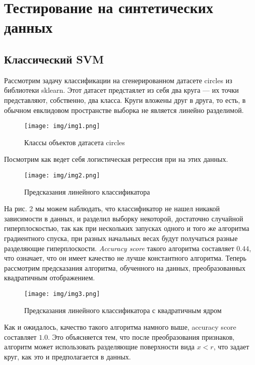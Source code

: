 \documentclass[twoside,twocolumn]{article}
\theoremstyle{plain}
\theoremstyle{definition}
\begin{document}
\section{Тестирование на синтетических данных}
\subsection{Классический SVM}
Рассмотрим задачу классификации на сгенерированном датасете circles из библиотеки sklearn. Этот датасет предстаялет из себя два круга — их
точки представляют, собственно, два класса. Круги вложены друг в друга, то есть, в обычном евклидовом пространстве выборка не является линейно
разделимой.
\begin{figure}[!h]
  \caption{Классы объектов датасета circles}
  \centering
  \texttt{[image: img/img1.png]}
  \label{fig:circles}
\end{figure}

Посмотрим как ведет себя логистическая регрессия при на этих данных.

\begin{figure}[!h]
  \caption{Предсказания линейного классификатора}
  \centering
  \texttt{[image: img/img2.png]}
  \label{fig:circles2}
\end{figure}

На рис. 2 мы можем наблюдать, что классификатор не нашел никакой зависимости в данных, и разделил выборку некоторой, достаточно случайной гиперплоскостью,
так как при нескольких запусках одного и того же алгоритма градиентного спуска, при разных начальных весах будут получаться разные разделяющие гиперплоскости.
\emph{Accuracy score} такого алгоритма составляет $0.44$, что означает, что он имеет качество не лучше константного алгоритма.
Теперь рассмотрим предсказания алгоритма, обученного на данных, преобразованных квадратичным отображением.

\begin{figure}[!h]
  \caption{Предсказания линейного классификатора с квадратичным ядром}
  \centering
  \texttt{[image: img/img3.png]}
  \label{fig:circles3}
\end{figure}

Как и ожидалось, качество такого алгоритма намного выше, accuracy score составляет $1.0$. Это объясняется тем, что после преобразования признаков,
алгоритм может использовать разделяющие поверхности вида $x < r$, что задает круг, как это и предполагается в данных.
\end{document}
